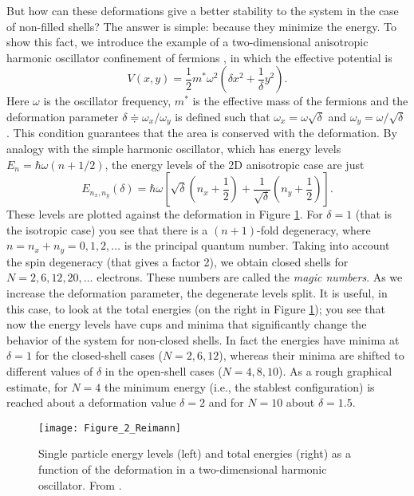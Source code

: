 But how can these deformations give a better stability to the system in the case of non-filled shells? The answer is simple: because they minimize the energy. To show this fact, we introduce the example of a two-dimensional anisotropic harmonic oscillator confinement of fermions \citep[as in][]{Reimann2002}, in which the effective potential is 
\begin{equation}
	V(x,y) = \frac{1}{2}m^*\omega^2\left(\delta x^2 + \frac{1}{\delta}y^2\right).
\end{equation}
Here $\omega$ is the oscillator frequency, $m^*$ is the effective mass of the fermions and the deformation parameter $\delta \doteqdot \omega_x/\omega_y$ is defined such that $\omega_x=\omega\sqrt{\delta}$ and $\omega_y=\omega/\sqrt{\delta}$. This condition guarantees that the area is conserved with the deformation. By analogy with the simple harmonic oscillator, which has energy levels $E_n = \hbar\omega(n+1/2)$, the energy levels of the 2D anisotropic case are just
\begin{equation}
	E_{n_x,n_y}(\delta) = \hbar\omega\left[\sqrt{\delta}\left(n_x+\frac{1}{2}\right) + \frac{1}{\sqrt{\delta}}\left(n_y+\frac{1}{2}\right)\right].
\end{equation}
These levels are plotted against the deformation in Figure \ref{fig:Figure_2_Reimann}. For $\delta=1$ (that is the isotropic case) you see that there is a $(n+1)$-fold degeneracy, where $n=n_x+n_y=0,1,2,\ldots$ is the principal quantum number. Taking into account the spin degeneracy (that gives a factor 2), we obtain closed shells for $N=2,6,12,20,\ldots$ electrons. These numbers are called the \emph{magic numbers}. As we increase the deformation parameter, the degenerate levels split. It is useful, in this case, to look at the total energies (on the right in Figure \ref{fig:Figure_2_Reimann}); you see that now the energy levels have cups and minima that significantly change the behavior of the system for non-closed shells. In fact the energies have minima at $\delta=1$ for the closed-shell cases ($N=2,6,12$), whereas their minima are shifted to different values of $\delta$ in the open-shell cases ($N=4,8,10$). As a rough graphical estimate, for $N=4$ the minimum energy (i.e., the stablest configuration) is reached about a deformation value $\delta=2$ and for $N=10$ about $\delta=1.5$.

\begin{figure}[h]%
	\centering
    \texttt{[image: Figure\_2\_Reimann]}
    \caption{Single particle energy levels (left) and total energies (right) as a function of the deformation in a two-dimensional harmonic oscillator. From \cite{Reimann2002}.}
	\label{fig:Figure_2_Reimann}
\end{figure}

